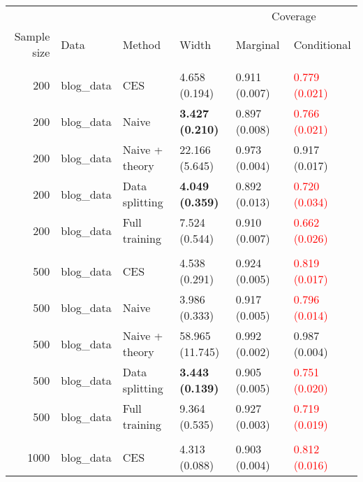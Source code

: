 
\begin{tabular}[t]{rlllll}
\toprule
\multicolumn{4}{c}{ } & \multicolumn{2}{c}{Coverage} \\
\cmidrule(l{3pt}r{3pt}){5-6}
Sample size & Data & Method & Width & Marginal & Conditional\\
\midrule
\addlinespace[0.3em]
\multicolumn{6}{l}{\textbf{200}}\\
\hspace{1em}200 & blog\_data & CES & 4.658 (0.194) & 0.911 (0.007) & \textcolor{red}{0.779 (0.021)}\\
\hspace{1em}200 & blog\_data & Naive & \textbf{3.427 (0.210)} & 0.897 (0.008) & \textcolor{red}{0.766 (0.021)}\\
\hspace{1em}200 & blog\_data & Naive + theory & 22.166 (5.645) & 0.973 (0.004) & 0.917 (0.017)\\
\hspace{1em}200 & blog\_data & Data splitting & \textbf{4.049 (0.359)} & 0.892 (0.013) & \textcolor{red}{0.720 (0.034)}\\
\hspace{1em}200 & blog\_data & Full training & 7.524 (0.544) & 0.910 (0.007) & \textcolor{red}{0.662 (0.026)}\\
\addlinespace[0.3em]
\multicolumn{6}{l}{\textbf{500}}\\
\hspace{1em}500 & blog\_data & CES & 4.538 (0.291) & 0.924 (0.005) & \textcolor{red}{0.819 (0.017)}\\
\hspace{1em}500 & blog\_data & Naive & 3.986 (0.333) & 0.917 (0.005) & \textcolor{red}{0.796 (0.014)}\\
\hspace{1em}500 & blog\_data & Naive + theory & 58.965 (11.745) & 0.992 (0.002) & 0.987 (0.004)\\
\hspace{1em}500 & blog\_data & Data splitting & \textbf{3.443 (0.139)} & 0.905 (0.005) & \textcolor{red}{0.751 (0.020)}\\
\hspace{1em}500 & blog\_data & Full training & 9.364 (0.535) & 0.927 (0.003) & \textcolor{red}{0.719 (0.019)}\\
\addlinespace[0.3em]
\multicolumn{6}{l}{\textbf{1000}}\\
\hspace{1em}1000 & blog\_data & CES & 4.313 (0.088) & 0.903 (0.004) & \textcolor{red}{0.812 (0.016)}\\

\end{tabular}
